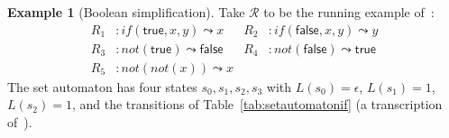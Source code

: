 \documentclass[11pt]{article}
\theoremstyle{plain}
\theoremstyle{definition}
\newtheorem{example}[theorem]{Example}
\theoremstyle{remark}
\newcommand{\rew}{\leadsto}
\newcommand{\true}{\mathsf{true}}
\newcommand{\false}{\mathsf{false}}
\begin{document}
\begin{example}[Boolean simplification]\label{ex:if-not}
Take $\mathcal{R}$ to be the running example
of~\cite[Ex.~8]{BouwmanErkens2022}:
\begin{align*}
  R_{1} &: \mathit{if}(\true, x, y) \rew x &
  R_{2} &: \mathit{if}(\false, x, y) \rew y \\
  R_{3} &: \mathit{not}(\true) \rew \false &
  R_{4} &: \mathit{not}(\false) \rew \true \\
  R_{5} &: \mathit{not}(\mathit{not}(x)) \rew x &&
\end{align*}
The set automaton has four states $s_{0}, s_{1}, s_{2}, s_{3}$ with
$L(s_{0}) = \epsilon$, $L(s_{1}) = 1$, $L(s_{2}) = 1$, and the transitions
of Table~\ref{tab:setautomatonif} (a transcription
of~\cite[Fig.~3]{BouwmanErkens2022}).


\end{example}
\end{document}
